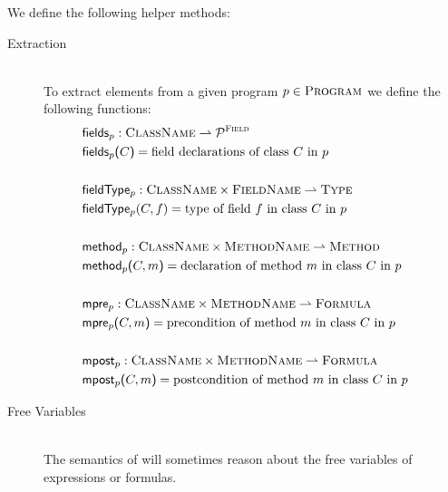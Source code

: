 We define the following helper methods:

\begin{description}
    \item[Extraction]~\\
    To extract elements from a given program $p \in \textup{\textsc{Program}}$ we define the following functions:
    \begin{align*}
         & \textup{\textmd{\textsf{fields$_p$}}} : \textup{\textsc{ClassName}} \rightharpoonup \mathcal{P}^{\textup{\textsc{Field}}}                  &  \\
         & \textup{\textmd{\textsf{fields$_p$($C$)}}} = \text{field declarations of class $C$ in $p$}                              &  \\
         & ~                                                                                       &  \\
    	 & \textup{\textmd{\textsf{fieldType$_p$}}} : \textup{\textsc{ClassName}} \times \textup{\textsc{FieldName}} \rightharpoonup \textup{\textsc{Type}}                & ~ \\
    	 & \textup{\textmd{\textsf{fieldType$_p$}}}(C, f) = \text{type of field $f$ in class $C$ in $p$}                         &  \\
    	 & ~                                                                                       &  \\
    	 & \textup{\textmd{\textsf{method$_p$}}} : \textup{\textsc{ClassName}} \times \textup{\textsc{MethodName}} \rightharpoonup \textup{\textsc{Method}} &  \\
    	 & \textup{\textmd{\textsf{method$_p$($C, m$)}}} = \text{declaration of method $m$ in class $C$ in $p$}                   &  \\
    	 & ~                                                                                       &  \\
    	 & \textup{\textmd{\textsf{mpre$_p$}}} : \textup{\textsc{ClassName}} \times \textup{\textsc{MethodName}} \rightharpoonup \textup{\textsc{Formula}}  &  \\
    	 & \textup{\textmd{\textsf{mpre$_p$($C, m$)}}} = \text{precondition of method $m$ in class $C$ in $p$}                    &  \\
    	 & ~                                                                                       &  \\
    	 & \textup{\textmd{\textsf{mpost$_p$}}} : \textup{\textsc{ClassName}} \times \textup{\textsc{MethodName}} \rightharpoonup \textup{\textsc{Formula}} &  \\
    	 & \textup{\textmd{\textsf{mpost$_p$($C, m$)}}} = \text{postcondition of method $m$ in class $C$ in $p$}                   &
    \end{align*}
    
    \item[Free Variables]~\\
    The semantics of \svlidf will sometimes reason about the free variables of expressions or formulas.
    

\end{description}
